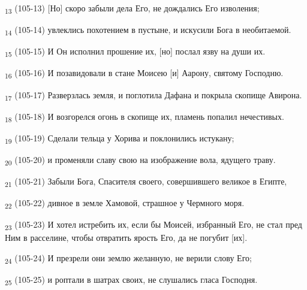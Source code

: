 \begin{tcolorbox}
\textsubscript{13} (105-13) [Но] скоро забыли дела Его, не дождались Его изволения;
\end{tcolorbox}
\begin{tcolorbox}
\textsubscript{14} (105-14) увлеклись похотением в пустыне, и искусили Бога в необитаемой.
\end{tcolorbox}
\begin{tcolorbox}
\textsubscript{15} (105-15) И Он исполнил прошение их, [но] послал язву на души их.
\end{tcolorbox}
\begin{tcolorbox}
\textsubscript{16} (105-16) И позавидовали в стане Моисею [и] Аарону, святому Господню.
\end{tcolorbox}
\begin{tcolorbox}
\textsubscript{17} (105-17) Разверзлась земля, и поглотила Дафана и покрыла скопище Авирона.
\end{tcolorbox}
\begin{tcolorbox}
\textsubscript{18} (105-18) И возгорелся огонь в скопище их, пламень попалил нечестивых.
\end{tcolorbox}
\begin{tcolorbox}
\textsubscript{19} (105-19) Сделали тельца у Хорива и поклонились истукану;
\end{tcolorbox}
\begin{tcolorbox}
\textsubscript{20} (105-20) и променяли славу свою на изображение вола, ядущего траву.
\end{tcolorbox}
\begin{tcolorbox}
\textsubscript{21} (105-21) Забыли Бога, Спасителя своего, совершившего великое в Египте,
\end{tcolorbox}
\begin{tcolorbox}
\textsubscript{22} (105-22) дивное в земле Хамовой, страшное у Чермного моря.
\end{tcolorbox}
\begin{tcolorbox}
\textsubscript{23} (105-23) И хотел истребить их, если бы Моисей, избранный Его, не стал пред Ним в расселине, чтобы отвратить ярость Его, да не погубит [их].
\end{tcolorbox}
\begin{tcolorbox}
\textsubscript{24} (105-24) И презрели они землю желанную, не верили слову Его;
\end{tcolorbox}
\begin{tcolorbox}
\textsubscript{25} (105-25) и роптали в шатрах своих, не слушались гласа Господня.
\end{tcolorbox}
